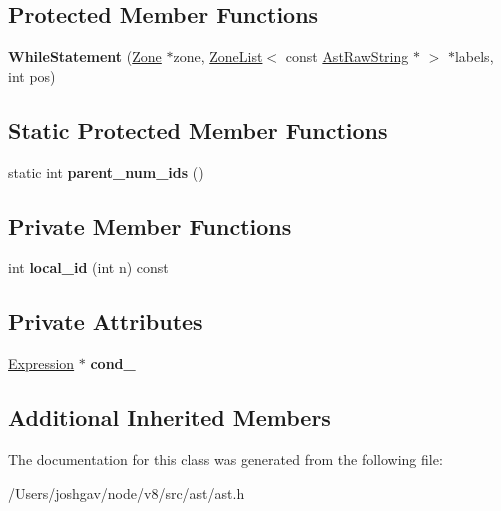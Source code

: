 \subsection*{Protected Member Functions}
\begin{DoxyCompactItemize}
\item 
{\bfseries While\+Statement} (\hyperlink{classv8_1_1internal_1_1_zone}{Zone} $\ast$zone, \hyperlink{classv8_1_1internal_1_1_zone_list}{Zone\+List}$<$ const \hyperlink{classv8_1_1internal_1_1_ast_raw_string}{Ast\+Raw\+String} $\ast$ $>$ $\ast$labels, int pos)\hypertarget{classv8_1_1internal_1_1_while_statement_a9463624a117164d7b1d7eb8e18797ff1}{}\label{classv8_1_1internal_1_1_while_statement_a9463624a117164d7b1d7eb8e18797ff1}

\end{DoxyCompactItemize}
\subsection*{Static Protected Member Functions}
\begin{DoxyCompactItemize}
\item 
static int {\bfseries parent\+\_\+num\+\_\+ids} ()\hypertarget{classv8_1_1internal_1_1_while_statement_a08e4990de7f640ab3f66b8cf178354c1}{}\label{classv8_1_1internal_1_1_while_statement_a08e4990de7f640ab3f66b8cf178354c1}

\end{DoxyCompactItemize}
\subsection*{Private Member Functions}
\begin{DoxyCompactItemize}
\item 
int {\bfseries local\+\_\+id} (int n) const \hypertarget{classv8_1_1internal_1_1_while_statement_a6c5bdb315eb2dae9e265bca2e00b41d5}{}\label{classv8_1_1internal_1_1_while_statement_a6c5bdb315eb2dae9e265bca2e00b41d5}

\end{DoxyCompactItemize}
\subsection*{Private Attributes}
\begin{DoxyCompactItemize}
\item 
\hyperlink{classv8_1_1internal_1_1_expression}{Expression} $\ast$ {\bfseries cond\+\_\+}\hypertarget{classv8_1_1internal_1_1_while_statement_a4a268a3f687ffdb888448b6030017148}{}\label{classv8_1_1internal_1_1_while_statement_a4a268a3f687ffdb888448b6030017148}

\end{DoxyCompactItemize}
\subsection*{Additional Inherited Members}


The documentation for this class was generated from the following file\+:\begin{DoxyCompactItemize}
\item 
/\+Users/joshgav/node/v8/src/ast/ast.\+h\end{DoxyCompactItemize}
